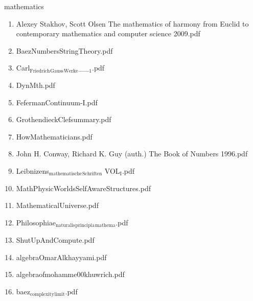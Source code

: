 \documentclass[11pt]{article}
\begin{document}
\item mathematics
\label{sec-1-1-1-1-29}
\begin{enumerate}
\item Alexey Stakhov, Scott Olsen The mathematics of harmony from Euclid to contemporary mathematics and computer science  2009.pdf
\label{sec-1-1-1-1-29-1}

\item BaezNumbersStringTheory.pdf
\label{sec-1-1-1-1-29-2}

\item Carl$_{\text{Friedrich}}$$_{\text{Gauss}}$$_{\text{Werke}}$\_\_$_{\text{1}}$.pdf
\label{sec-1-1-1-1-29-3}

\item DynMth.pdf
\label{sec-1-1-1-1-29-4}

\item FefermanContinuum-I.pdf
\label{sec-1-1-1-1-29-5}

\item GrothendieckClefsummary.pdf
\label{sec-1-1-1-1-29-6}

\item HowMathematicians.pdf
\label{sec-1-1-1-1-29-7}

\item John H. Conway,  Richard K. Guy  (auth.) The Book of Numbers  1996.pdf
\label{sec-1-1-1-1-29-8}

\item Leibnizens$_{\text{mathematische}}$$_{\text{Schriften}}$ VOL$_{\text{I}}$.pdf
\label{sec-1-1-1-1-29-9}

\item MathPhysicWorldsSelfAwareStructures.pdf
\label{sec-1-1-1-1-29-10}

\item MathematicalUniverse.pdf
\label{sec-1-1-1-1-29-11}

\item Philosophiae$_{\text{naturalis}}$$_{\text{principia}}$$_{\text{mathema}}$.pdf
\label{sec-1-1-1-1-29-12}

\item ShutUpAndCompute.pdf
\label{sec-1-1-1-1-29-13}

\item algebraOmarAlkhayyami.pdf
\label{sec-1-1-1-1-29-14}

\item algebraofmohamme00khuwrich.pdf
\label{sec-1-1-1-1-29-15}

\item baez$_{\text{complexity}}$$_{\text{limit}}$.pdf
\label{sec-1-1-1-1-29-16}


\end{enumerate}
\end{document}
